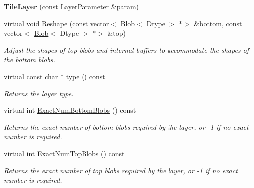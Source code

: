 \begin{DoxyCompactItemize}
\mbox{\label{classcaffe_1_1_tile_layer_a7c6cb911e56abaf3dc43c38b8dc0e94e}} 
{\bfseries Tile\+Layer} (const \mbox{\hyperlink{classcaffe_1_1_layer_parameter}{Layer\+Parameter}} \&param)
\item 
virtual void \mbox{\hyperlink{classcaffe_1_1_tile_layer_a1fe845a1597dbc119e922ee92032632b}{Reshape}} (const vector$<$ \mbox{\hyperlink{classcaffe_1_1_blob}{Blob}}$<$ Dtype $>$ $\ast$$>$ \&bottom, const vector$<$ \mbox{\hyperlink{classcaffe_1_1_blob}{Blob}}$<$ Dtype $>$ $\ast$$>$ \&top)
\begin{DoxyCompactList}\small\item\em Adjust the shapes of top blobs and internal buffers to accommodate the shapes of the bottom blobs. \end{DoxyCompactList}\item 
\mbox{\label{classcaffe_1_1_tile_layer_a1ef109677c3dd7fb9963a69c633585e8}} 
virtual const char $\ast$ \mbox{\hyperlink{classcaffe_1_1_tile_layer_a1ef109677c3dd7fb9963a69c633585e8}{type}} () const
\begin{DoxyCompactList}\small\item\em Returns the layer type. \end{DoxyCompactList}\item 
virtual int \mbox{\hyperlink{classcaffe_1_1_tile_layer_ac7e0da0e543f134e04b00d8625132b71}{Exact\+Num\+Bottom\+Blobs}} () const
\begin{DoxyCompactList}\small\item\em Returns the exact number of bottom blobs required by the layer, or -\/1 if no exact number is required. \end{DoxyCompactList}\item 
virtual int \mbox{\hyperlink{classcaffe_1_1_tile_layer_a1040cc3b4fb028d54f67a685513d745b}{Exact\+Num\+Top\+Blobs}} () const
\begin{DoxyCompactList}\small\item\em Returns the exact number of top blobs required by the layer, or -\/1 if no exact number is required. \end{DoxyCompactList}\end{DoxyCompactItemize}
